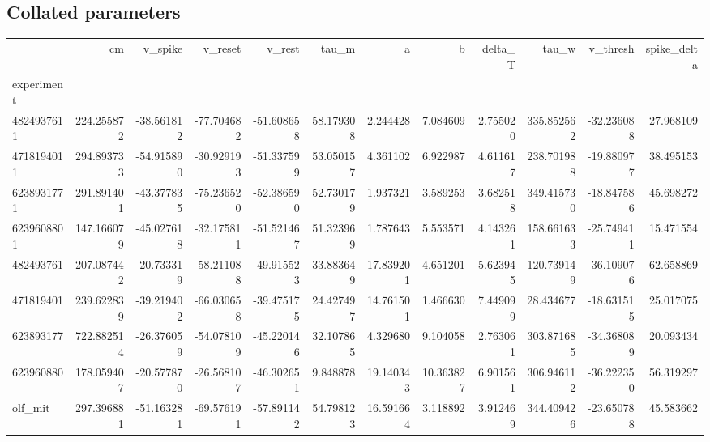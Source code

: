 \subsection{Collated parameters}\begin{tabular}{lrrrrrrrrrrr}
\toprule
{} &          cm &    v\_spike &    v\_reset &     v\_rest &      tau\_m &          a &          b &   delta\_T &       tau\_w &   v\_thresh &  spike\_delta \\
experiment                         &             &            &            &            &            &            &            &           &             &            &              \\
\midrule
4824937611                         &  224.255872 & -38.561812 & -77.704682 & -51.608658 &  58.179308 &   2.244428 &   7.084609 &  2.755020 &  335.852562 & -32.236088 &    27.968109 \\
4718194011                         &  294.893733 & -54.915890 & -30.929193 & -51.337599 &  53.050157 &   4.361102 &   6.922987 &  4.611617 &  238.701988 & -19.880977 &    38.495153 \\
6238931771                         &  291.891401 & -43.377835 & -75.236520 & -52.386590 &  52.730179 &   1.937321 &   3.589253 &  3.682518 &  349.415730 & -18.847586 &    45.698272 \\
6239608801                         &  147.166079 & -45.027618 & -32.175811 & -51.521467 &  51.323969 &   1.787643 &   5.553571 &  4.143261 &  158.661633 & -25.749411 &    15.471554 \\
482493761                          &  207.087442 & -20.733319 & -58.211088 & -49.915523 &  33.883649 &  17.839201 &   4.651201 &  5.623945 &  120.739149 & -36.109076 &    62.658869 \\
471819401                          &  239.622839 & -39.219402 & -66.030658 & -39.475175 &  24.427497 &  14.761501 &   1.466630 &  7.449099 &   28.434677 & -18.631515 &    25.017075 \\
623893177                          &  722.882514 & -26.376059 & -54.078109 & -45.220146 &  32.107865 &   4.329680 &   9.104058 &  2.763061 &  303.871685 & -34.368089 &    20.093434 \\
623960880                          &  178.059407 & -20.577870 & -26.568107 & -46.302651 &   9.848878 &  19.140343 &  10.363827 &  6.901561 &  306.946112 & -36.222350 &    56.319297 \\
olf\_mit                            &  297.396881 & -51.163281 & -69.576191 & -57.891142 &  54.798123 &  16.591664 &   3.118892 &  3.912469 &  344.409426 & -23.650788 &    45.583662 \\

\end{tabular}
